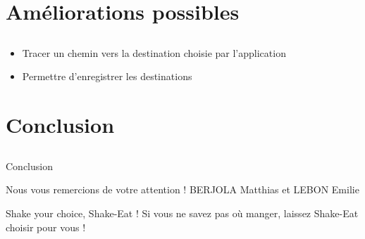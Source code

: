 \section{Améliorations possibles}

    \subsection{}
    \frame{\sectionpage}

    
    
    \begin{frame}
    \begin{itemize}
    \item Tracer un chemin vers la destination choisie par l'application
    	\item Permettre d'enregistrer les destinations 
    \end{itemize}
    \end{frame}
    
    
    


\section{Conclusion}

    \subsection{}
    \frame{\sectionpage}

    
    
    \begin{frame}{Conclusion}
        \begin{block}{\centering Nous vous remercions de votre attention !}
             \centering \alert{ BERJOLA Matthias et LEBON Emilie}
        \end{block}
    \end{frame}
    
    
    \begin{frame}{Shake your choice, Shake-Eat !}
        \centering
        Si vous ne savez pas où manger, laissez Shake-Eat choisir pour vous !
    \end{frame}